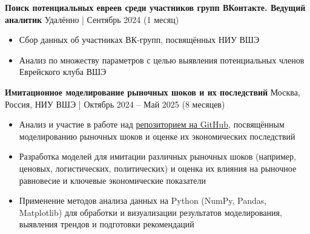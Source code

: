 \textbf{Поиск потенциальных евреев среди участников групп ВКонтакте. Ведущий аналитик} \hfill Удалённо | Сентябрь 2024 (1 месяц)
\begin{itemize}[noitemsep, topsep=0pt, partopsep=0pt, parsep=0pt]
    \item Сбор данных об участниках ВК-групп, посвящённых НИУ ВШЭ
    \item Анализ по множеству параметров с целью выявления потенциальных членов Еврейского клуба ВШЭ
\end{itemize}

\textbf{Имитационное моделирование рыночных шоков и их последствий} \hfill Москва, Россия, НИУ ВШЭ | Октябрь 2024 – Май 2025 (8 месяцев)
\begin{itemize}[noitemsep, topsep=0pt, partopsep=0pt, parsep=0pt]
    \item Анализ и участие в работе над \href{https://github.com/bognik002/2D-ABM}{репозиторием на GitHub}, посвящённым моделированию рыночных шоков и оценке их экономических последствий
    \item Разработка моделей для имитации различных рыночных шоков (например, ценовых, логистических, политических) и оценка их влияния на рыночное равновесие и ключевые экономические показатели
    \item Применение методов анализа данных на Python (NumPy, Pandas, Matplotlib) для обработки и визуализации результатов моделирования, выявления трендов и подготовки рекомендаций
\end{itemize}

